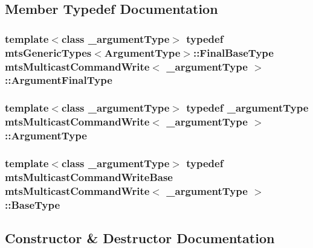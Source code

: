 \subsection{Member Typedef Documentation}
\hypertarget{classmts_multicast_command_write_a6a53ad6556ef466ffc58b8800ca81f46}{}
\subsubsection[{Argument\+Final\+Type}]{\setlength{\rightskip}{0pt plus 5cm}template$<$class \+\_\+argument\+Type$>$ typedef {\bf mts\+Generic\+Types}$<${\bf Argument\+Type}$>$\+::Final\+Base\+Type {\bf mts\+Multicast\+Command\+Write}$<$ \+\_\+argument\+Type $>$\+::{\bf Argument\+Final\+Type}}\label{classmts_multicast_command_write_a6a53ad6556ef466ffc58b8800ca81f46}
\hypertarget{classmts_multicast_command_write_a064ab3c37be15f5f41dc6fd39595f207}{}
\subsubsection[{Argument\+Type}]{\setlength{\rightskip}{0pt plus 5cm}template$<$class \+\_\+argument\+Type$>$ typedef \+\_\+argument\+Type {\bf mts\+Multicast\+Command\+Write}$<$ \+\_\+argument\+Type $>$\+::{\bf Argument\+Type}}\label{classmts_multicast_command_write_a064ab3c37be15f5f41dc6fd39595f207}
\hypertarget{classmts_multicast_command_write_aa950168043db4770666c31d84145a37a}{}
\subsubsection[{Base\+Type}]{\setlength{\rightskip}{0pt plus 5cm}template$<$class \+\_\+argument\+Type$>$ typedef {\bf mts\+Multicast\+Command\+Write\+Base} {\bf mts\+Multicast\+Command\+Write}$<$ \+\_\+argument\+Type $>$\+::{\bf Base\+Type}}\label{classmts_multicast_command_write_aa950168043db4770666c31d84145a37a}


\subsection{Constructor \& Destructor Documentation}
\hypertarget{classmts_multicast_command_write_af6df9513f0bbc9dccd2775429db99bb9}{}
